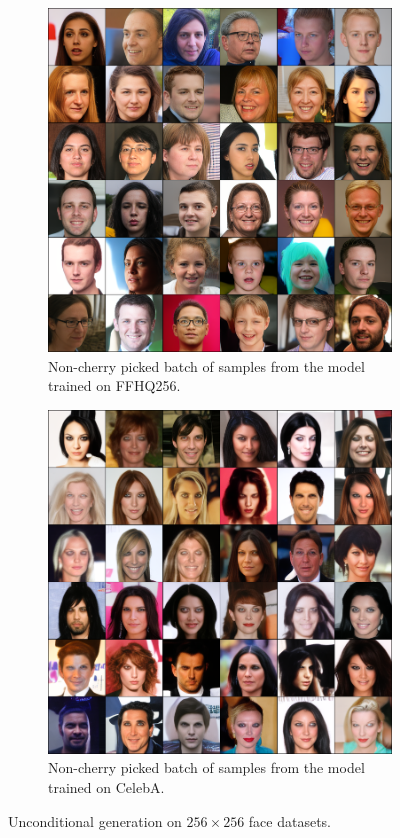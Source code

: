 \begin{figure}[ht]
    \centering
    \begin{subfigure}[b]{0.47\textwidth}
        \centering
        \includegraphics[width=1.0\textwidth]{figures/ffhq256-samples-small.png}
        \caption{
            Non-cherry picked batch of samples from the model trained on FFHQ256.
        }
    \end{subfigure}
    \hfill
    \begin{subfigure}[b]{0.47\textwidth}
        \centering
        \includegraphics[width=1.0\textwidth]{figures/celeba-samples-small.png}
        \caption{
            Non-cherry picked batch of samples from the model trained on CelebA.
        }
    \end{subfigure}
    \caption{Unconditional generation on $256 \times 256$ face datasets.}
\end{figure}

